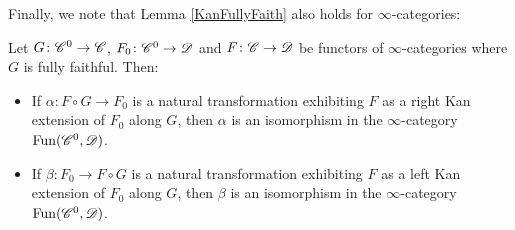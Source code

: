 \documentclass[../../thesis.tex]{subfiles}
\begin{document}
Finally, we note that Lemma \ref{KanFullyFaith} also holds for $\infty$-categories:
\begin{proposition}\label{KanFullyFaithInfty}
    Let $G \colon \mathscr{C}^{0} \to \mathscr{C}$, $F_0\colon \mathscr{C}^{0} \to \mathscr{D}$ and $F\colon \mathscr{C} \to \mathscr{D}$ be functors of $\infty$-categories where $G$ is fully faithful.
    Then:
    \begin{itemize}
        \item If $\alpha \colon F \circ G \to F_0$ is a natural transformation exhibiting $F$ as a right Kan extension of $F_0$ along $G$, then $\alpha$ is an isomorphism in the $\infty$-category $\mathrm{Fun}(\mathscr{C}^{0}, \mathscr{D})$.
        \item If $\beta \colon F_0 \to F \circ G$ is a natural transformation exhibiting $F$ as a left Kan extension of $F_0$ along $G$, then $\beta$ is an isomorphism in the $\infty$-category $\mathrm{Fun}(\mathscr{C}^{0}, \mathscr{D})$.
    \end{itemize}
\end{proposition}
\end{document}
